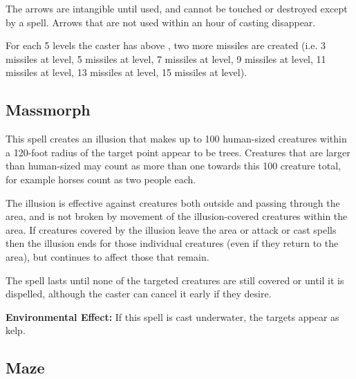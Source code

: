 \begin{multicols*}{2}
The arrows are intangible until used, and cannot be touched or destroyed except by a  spell. Arrows that are not used within an hour of casting disappear.

For each 5 levels the caster has above , two more missiles are created (i.e. 3 missiles at  level, 5 missiles at  level, 7 missiles at  level, 9 missiles at  level, 11 missiles at  level, 13 missiles at  level, 15 missiles at  level).

\subsection{Massmorph}\label{spell:Massmorph}


This spell creates an illusion that makes up to 100 human-sized creatures within a 120-foot radius of the target point appear to be trees. Creatures that are larger than human-sized may count as more than one towards this 100 creature total, for example horses count as two people each.

The illusion is effective against creatures both outside and passing through the area, and is not broken by movement of the illusion-covered creatures within the area. If creatures covered by the illusion leave the area or attack or cast spells then the illusion ends for those individual creatures (even if they return to the area), but continues to affect those that remain.

The spell lasts until none of the targeted creatures are still covered or until it is dispelled, although the caster can cancel it early if they desire.

\textbf{Environmental Effect:} If this spell is cast underwater, the targets appear as kelp.

\subsection{Maze}\label{spell:Maze}
\end{multicols*}
